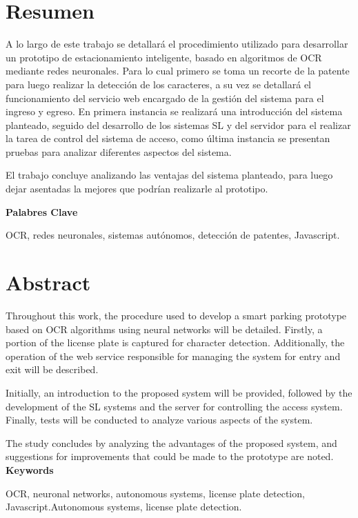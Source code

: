 \chapter*{Resumen}
A lo largo de este trabajo se detallará el procedimiento utilizado para desarrollar un prototipo de estacionamiento inteligente, basado en algoritmos de OCR mediante redes neuronales. Para lo cual primero se toma un recorte de la patente para luego realizar la detección de los caracteres, a su vez se detallará el funcionamiento del servicio web encargado de la gestión del sistema para el ingreso y egreso.
En primera instancia se realizará una introducción del sistema planteado, seguido del desarrollo de los sistemas SL y  del servidor para el realizar la tarea de control del sistema de acceso, como última instancia se presentan pruebas para analizar diferentes aspectos del sistema.

El trabajo concluye analizando las ventajas del sistema planteado, para luego dejar asentadas la mejores que podrían realizarle al prototipo.



\vspace*{\fill}
\noindent \textbf{Palabres Clave} 

OCR, redes neuronales, sistemas autónomos, detección de patentes, Javascript.

\chapter*{Abstract}
Throughout this work, the procedure used to develop a smart parking prototype based on OCR algorithms using neural networks will be detailed. Firstly, a portion of the license plate is captured for character detection. Additionally, the operation of the web service responsible for managing the system for entry and exit will be described.

Initially, an introduction to the proposed system will be provided, followed by the development of the SL systems and the server for controlling the access system. Finally, tests will be conducted to analyze various aspects of the system.

The study concludes by analyzing the advantages of the proposed system, and suggestions for improvements that could be made to the prototype are noted.
\vspace*{\fill}
\noindent \textbf{Keywords} 

OCR, neuronal networks, autonomous systems, license plate detection, Javascript.Autonomous systems, license plate detection.